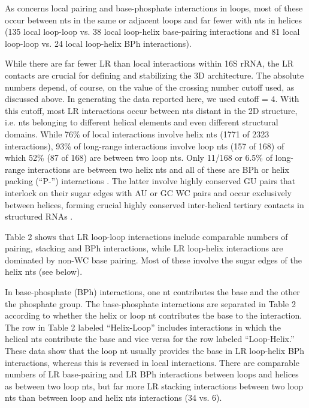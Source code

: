 As concerns local pairing and base-phosphate interactions in loops, most of
these occur between nts in the same or adjacent loops and far fewer with nts in
helices (135 local loop-loop vs. 38 local loop-helix base-pairing interactions
and 81 local loop-loop vs. 24 local loop-helix BPh interactions). 

While there are far fewer LR than local interactions within 16S rRNA, the LR
contacts are crucial for defining and stabilizing the 3D architecture. The
absolute numbers depend, of course, on the value of the crossing number cutoff
used, as discussed above. In generating the data reported here, we used cutoff =
4. With this cutoff, most LR interactions occur between nts distant in the 2D
structure, i.e. nts belonging to different helical elements and even
different structural domains. While 76\% of local interactions involve helix
nts (1771 of 2323 interactions), 93\% of long-range interactions involve loop
nts (157 of 168) of which 52\% (87 of 168) are between two loop nts.  Only
11/168 or 6.5\% of long-range interactions are between two helix nts and all
of these are BPh or helix packing  (``P-'') interactions \cite{Mokdad2006b}.
The latter involve highly conserved GU pairs that interlock on their sugar
edges with AU or GC WC pairs and occur exclusively between helices, forming
crucial highly conserved inter-helical tertiary contacts in structured RNAs
\cite{Gagnon2006, Gagnon2002}. 

Table 2 shows that LR loop-loop interactions include comparable numbers of
pairing, stacking and BPh interactions, while LR loop-helix interactions are
dominated by non-WC base pairing. Most of these involve the sugar edges of the
helix nts (see below). 

In base-phosphate (BPh) interactions, one nt contributes the base and the other
the phosphate group. The base-phosphate interactions are separated in Table 2
according to whether the helix or loop nt contributes the base to the
interaction. The row in Table 2 labeled ``Helix-Loop'' includes interactions in
which the helical nts contribute the base and vice versa for the row labeled
``Loop-Helix.'' These data show that the loop nt usually provides the base in LR
loop-helix BPh interactions, whereas this is reversed in local interactions.
There are comparable numbers of LR base-pairing and LR BPh interactions between
loops and helices as between two loop nts, but far more LR stacking interactions
between two loop nts than between loop and helix nts interactions (34 vs. 6). 

